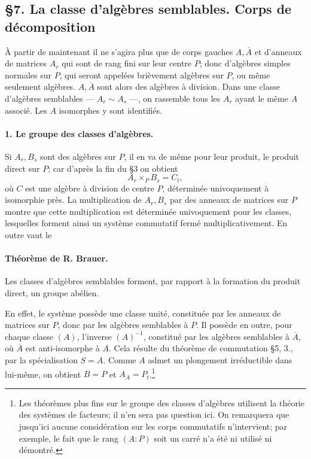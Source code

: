 \subsection*{\S 7. La classe d'algèbres semblables. Corps de décomposition}

À partir de maintenant il ne s'agira plus que de corps gauches \(A,\overline A\) et d'anneaux de matrices \(A_r\) qui sont de rang fini sur leur centre \(P\); donc d'algèbres simples normales sur \(P\), qui seront appelées brièvement algèbres sur \(P\), ou même seulement algèbres. \(A,\overline A\) sont alors des algèbres à division. Dans une classe d'algèbres semblables --- \(A_r\sim A_s\) ---, on rassemble tous les \(A_r\) ayant le même \(A\) associé. Les \(A\) isomorphes y sont identifiés.

\paragraph{1. Le groupe des classes d'algèbres.}
Si \(A_r,B_s\) sont des algèbres sur \(P\), il en va de même pour leur produit, le produit direct sur \(P\); car d'après la fin du \S 3 on obtient
\[
        A_r\times_P B_s=C_t,
\]
où \(C\) est une algèbre à division de centre \(P\), déterminée univoquement à isomorphie près. La multiplication de \(A_r,B_s\) par des anneaux de matrices sur \(P\) montre que cette multiplication est déterminée univoquement pour les classes, lesquelles forment ainsi un système commutatif fermé multiplicativement. En outre vaut le

\paragraph{Théorème de R. Brauer.}
Les classes d'algèbres semblables forment, par rapport à la formation du produit direct, un groupe abélien.

En effet, le système possède une classe unité, constituée par les anneaux de matrices sur \(P\), donc par les algèbres semblables à \(P\). Il possède en outre, pour chaque classe \((A)\), l'inverse \((A)^{-1}\), constitué par les algèbres semblables à \(\overline A\), où \(\overline A\) est anti-isomorphe à \(A\). Cela résulte du théorème de commutation \S 5, 3., par la spécialisation \(S=A\). Comme \(A\) admet un plongement irréductible dans lui-même, on obtient \(B=P\) et \(A_A=P_t\).\footnote{Les théorèmes plus fins sur le groupe des classes d'algèbres utilisent la théorie des systèmes de facteurs; il n'en sera pas question ici. On remarquera que jusqu'ici aucune considération sur les corps commutatifs n'intervient; par exemple, le fait que le rang \((A:P)\) soit un carré n'a été ni utilisé ni démontré.}

